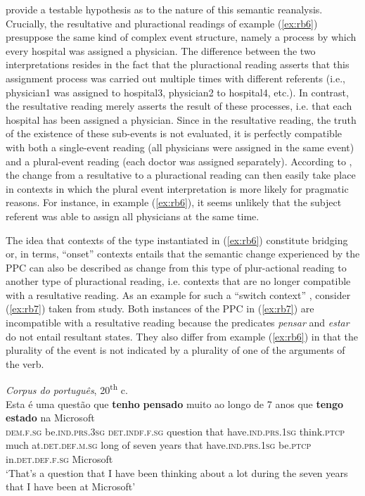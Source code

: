 \documentclass[output=paper,colorlinks,citecolor=brown]{langscibook}
\begin{document}
\citet[40--48]{AmaralHowe2012} provide a testable hypothesis as to the nature of this semantic reanalysis. Crucially, the resultative and pluractional readings of example (\ref{ex:rb6}) presuppose the same kind of complex event structure, namely a process by which every hospital was assigned a physician. The difference between the two interpretations resides in the fact that the pluractional reading asserts that this assignment process was carried out multiple times with different referents (i.e., physician1 was assigned to hospital3, physician2 to hospital4, etc.). In contrast, the resultative reading merely asserts the result of these processes, i.e. that each hospital has been assigned a physician. Since in the resultative reading, the truth of the existence of these sub-events is not evaluated, it is perfectly compatible with both a single-event reading (all physicians were assigned in the same event) and a plural-event reading (each doctor was assigned separately). According to \citet[43--43]{AmaralHowe2012}, the change from a resultative to a pluractional reading can then easily take place in contexts in which the plural event interpretation is more likely for pragmatic reasons. For instance, in example (\ref{ex:rb6}), it seems unlikely that the subject referent was able to assign all physicians at the same time.

The idea that contexts of the type instantiated in (\ref{ex:rb6}) constitute bridging or, in  terms, “onset” contexts entails that the semantic change experienced by the PPC can also be described as change from this type of plur-actional reading to another type of pluractional reading, i.e. contexts that are no longer compatible with a resultative reading. As an example for such a “switch context” \citep[85]{Heine2002}, consider (\ref{ex:rb7}) taken from  study. Both instances of the PPC in (\ref{ex:rb7}) are incompatible with a resultative reading because the predicates \textit{pensar} and \textit{estar} do not entail resultant states. They also differ from example (\ref{ex:rb6}) in that the plurality of the event is not indicated by a plurality of one of the arguments of the verb.\pagebreak

\ea\label{ex:rb7}
\textit{Corpus do português}, 20\textsuperscript{th} c. \citep[37]{Becker2017}\\
\gll Esta é uma questão que \textbf{tenho} \textbf{pensado} muito ao longo de 7 anos que \textbf{tengo} \textbf{estado} na Microsoft\\
\textsc{dem.f.sg} be.\textsc{ind.prs.3sg} \textsc{det.indf.f.sg} question that have.\textsc{ind.prs.1sg} think.\textsc{ptcp} much at.\textsc{det.def.m.sg} long of seven years that have.\textsc{ind.prs.1sg} be.\textsc{ptcp} in.\textsc{det.def.f.sg} Microsoft\\
\glt ‘That’s a question that I have been thinking about a lot during the seven years that I have been at Microsoft’
\z
\end{document}

